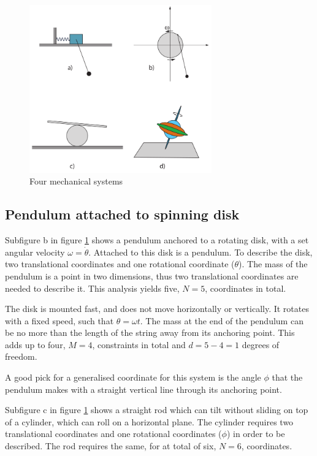 \documentclass[11pt]{amsart}
\newcommand{\nocontentsline}[3]{}
\newcommand{\tocless}[2]{\bgroup\let\addcontentsline=\nocontentsline#1{#2}\egroup}
\begin{document}
\begin{figure}
	\centering
	\includegraphics[width = 0.7\textwidth]{./figures/problem1.png}
	\caption{Four mechanical systems}
	\label{fig:mechanicalsystems}
\end{figure}

\tocless\subsection{Pendulum attached to spinning disk}
Subfigure b in figure \ref{fig:mechanicalsystems} shows a pendulum anchored to a rotating disk, with a set angular velocity $\omega=\dot{\theta}$. Attached to this disk is a pendulum. To describe the disk, two translational coordinates and one rotational coordinate ($\theta$). The mass of the pendulum is a point in two dimensions, thus two translational coordinates are needed to describe it. This analysis yields five, $N=5$, coordinates in total. 

The  disk is mounted fast, and does not move horizontally or vertically. It rotates with a fixed speed, such that $\theta = \omega t$. The mass at the end of the pendulum can be no more than the length of the string away from its anchoring point. This adds up to four, $M=4$, constraints in total and $d = 5-4=1$ degrees of freedom.

A good pick for a generalised coordinate for this system is the angle $\phi$ that the pendulum makes with a straight vertical line through its anchoring point.

\tocless\subsection{Makeshift see-saw}
Subfigure c in figure \ref{fig:mechanicalsystems} shows a straight rod which can tilt without sliding on top of a cylinder, which can roll on a horizontal plane. The cylinder requires two translational coordinates and one rotational coordinates ($\phi$) in order to be described. The rod requires the same, for at total of six, $N=6$, coordinates.
\end{document}
